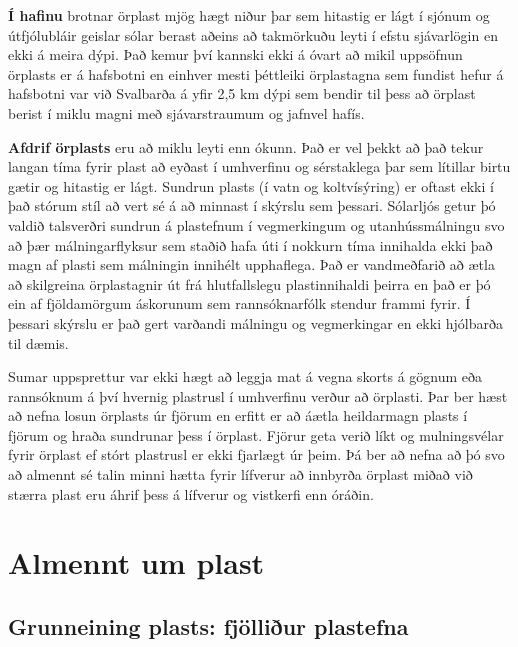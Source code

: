 \documentclass[icelandic,]{book}
\begin{document}
\textbf{Í hafinu} brotnar örplast mjög hægt niður þar sem hitastig er lágt í sjónum og útfjólubláir geislar sólar berast aðeins að takmörkuðu leyti í efstu sjávarlögin en ekki á meira dýpi. Það kemur því kannski ekki á óvart að mikil uppsöfnun örplasts er á hafsbotni en einhver mesti þéttleiki örplastagna sem fundist hefur á hafsbotni var við Svalbarða á yfir 2,5 km dýpi sem bendir til þess að örplast berist í miklu magni með sjávarstraumum og jafnvel hafís.

\textbf{Afdrif örplasts} eru að miklu leyti enn ókunn. Það er vel þekkt að það tekur langan tíma fyrir plast að eyðast í umhverfinu og sérstaklega þar sem lítillar birtu gætir og hitastig er lágt. Sundrun plasts (í vatn og koltvísýring) er oftast ekki í það stórum stíl að vert sé á að minnast í skýrslu sem þessari. Sólarljós getur þó valdið talsverðri sundrun á plastefnum í vegmerkingum og utanhússmálningu svo að þær málningarflyksur sem staðið hafa úti í nokkurn tíma innihalda ekki það magn af plasti sem málningin innihélt upphaflega. Það er vandmeðfarið að ætla að skilgreina örplastagnir út frá hlutfallslegu plastinnihaldi þeirra en það er þó ein af fjöldamörgum áskorunum sem rannsóknarfólk stendur frammi fyrir. Í þessari skýrslu er það gert varðandi málningu og vegmerkingar en ekki hjólbarða til dæmis.

Sumar uppsprettur var ekki hægt að leggja mat á vegna skorts á gögnum eða rannsóknum á því hvernig plastrusl í umhverfinu verður að örplasti. Þar ber hæst að nefna losun örplasts úr fjörum en erfitt er að áætla heildarmagn plasts í fjörum og hraða sundrunar þess í örplast. Fjörur geta verið líkt og mulningsvélar fyrir örplast ef stórt plastrusl er ekki fjarlægt úr þeim. Þá ber að nefna að þó svo að almennt sé talin minni hætta fyrir lífverur að innbyrða örplast miðað við stærra plast eru áhrif þess á lífverur og vistkerfi enn óráðin.

\hypertarget{almennt-um-plast}{%
\chapter{Almennt um plast}\label{almennt-um-plast}}

\hypertarget{grunneining-plasts-fjolliur-plastefna}{%
\section*{Grunneining plasts: fjölliður plastefna}\label{grunneining-plasts-fjolliur-plastefna}}
\end{document}
